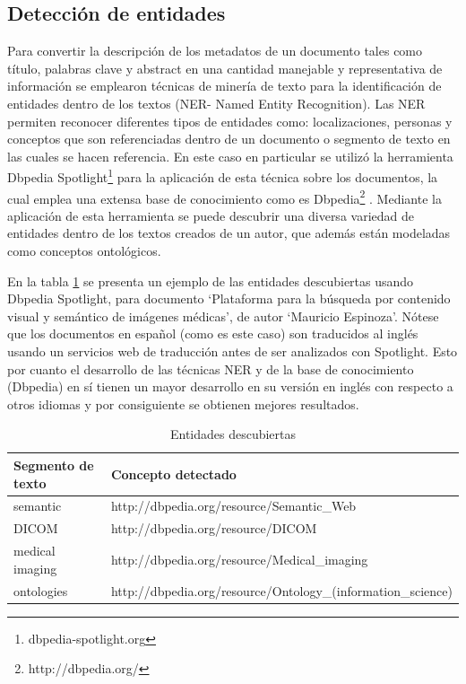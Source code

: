 \documentclass[conference]{IEEEtran}
\begin{document}
\subsection{Detección de entidades}
Para convertir la descripción de los metadatos de un documento tales como título, palabras clave y abstract en una cantidad manejable y representativa de información se emplearon técnicas de minería de texto para la identificación de entidades dentro de los textos (NER- Named Entity Recognition). Las NER permiten reconocer diferentes tipos de entidades como: localizaciones, personas y conceptos que son referenciadas dentro de un documento o segmento de texto en las cuales se hacen referencia. En este caso en particular se utilizó la herramienta Dbpedia Spotlight\footnote{dbpedia-spotlight.org} para la aplicación de esta técnica sobre los documentos, la cual emplea una extensa base de conocimiento como es Dbpedia\footnote{http://dbpedia.org/} \cite{mendes2011dbpedia}. Mediante la aplicación de esta herramienta se puede descubrir una diversa variedad de entidades dentro de los textos creados de un autor, que además están modeladas como conceptos ontológicos. 

En la tabla \ref{tb:entidades} se presenta un ejemplo de las entidades descubiertas usando Dbpedia Spotlight, para documento ‘Plataforma para la búsqueda por contenido visual y semántico de imágenes médicas’, de autor ‘Mauricio Espinoza’. Nótese que los documentos en español (como es este caso) son traducidos al inglés usando un servicios web de traducción antes de ser analizados con Spotlight. Esto por cuanto el desarrollo de las técnicas NER y de la base de conocimiento (Dbpedia) en sí tienen un mayor desarrollo en su versión en inglés con respecto a otros idiomas y por consiguiente se obtienen mejores resultados.

\begin{table}[]
\centering
\caption{Entidades descubiertas}
\label{tb:entidades}
\begin{tabular}{@{}ll@{}}
\toprule
Segmento de texto & Concepto detectado                                           \\ \midrule
semantic          & http://dbpedia.org/resource/Semantic\_Web                    \\
DICOM             & http://dbpedia.org/resource/DICOM                            \\
medical imaging   & http://dbpedia.org/resource/Medical\_imaging                 \\
ontologies        & http://dbpedia.org/resource/Ontology\_(information\_science) \\ \bottomrule
\end{tabular}
\end{table}
\end{document}

